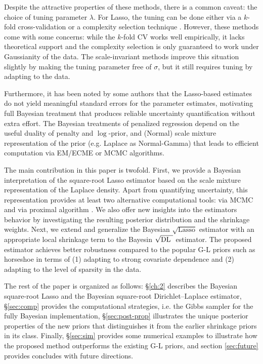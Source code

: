 \documentclass[10pt]{article}
\def\sql{$\sqrt{\text{Lasso}}$}
\def\sqdl{$\sqrt{\text{\rm{DL} }}$}
\begin{document}
Despite the attractive properties of these methods, there is a common caveat: the choice of tuning parameter $\lambda$. For Lasso, the tuning can be done either via a $k$-fold cross-validation or a complexity selection technique \citep{giraud2012high}. However, these methods come with some concerns: while the $k$-fold CV works well empirically, it lacks theoretical support and the complexity selection is only guaranteed to work under Gaussianity of the data. The scale-invariant methods improve this situation slightly by making the tuning parameter free of $\sigma$, but it still requires tuning by adapting to the data. 

Furthermore, it has been noted by some authors \citep{chatterjee2011bootstrap} that the Lasso-based estimates do not yield meaningful standard errors for the parameter estimates, motivating full Bayesian treatment that produces reliable uncertainty quantification without extra effort. The Bayesian treatments of penalized regression depend on the useful duality of penalty and $\log$-prior, and (Normal) scale mixture representation of the prior (e.g. Laplace as Normal-Gamma) that leads to efficient computation via EM/ECME or MCMC algorithms. 

The main contribution in this paper is twofold. First, we provide a Bayesian interpretation of the square-root Lasso estimator based on the scale mixture representation of the Laplace density. Apart from quantifying uncertainty, this representation provides at least two alternative computational tools: via MCMC and via proximal algorithm \citep{polson2015proximal}. We also offer new insights into the estimators behavior by investigating the resulting posterior distribution and the shrinkage weights. Next, we extend and generalize the Bayesian \sql{} estimator with an appropriate local shrinkage term to the Bayesin \sqdl{} estimator. The proposed estimator achieves better robustness compared to the popular G-L priors such as horseshoe in terms of (1) adapting to strong covariate dependence and (2) adapting to the level of sparsity in the data. 

The rest of the paper is organized as follows: \S \ref{ch:2} describes the Bayesian square-root Lasso and the Bayesian square-root Dirichlet--Laplace estimator, \S \ref{sec:comp} provides the computational strategies, i.e. the Gibbs sampler for the fully Bayesian implementation, \S \ref{sec:post-prop} illustrates the unique posterior properties of the new priors that distinguishes it from the earlier shrinkage priors in its class. Finally, \S \ref{sec:sim} provides some numerical examples to illustrate how the proposed method outperforms the existing G-L priors, and section \ref{sec:future} provides concludes with future directions.  
\end{document}
